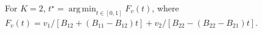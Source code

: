 For \(K=2\), \(t^\star=\operatorname*{arg\,min}_{t\in[0,1]}F_v(t)\), where \(F_v(t)=v_1/[B_{12}+(B_{11}-B_{12})t]+v_2/[B_{22}-(B_{22}-B_{21})t]\).